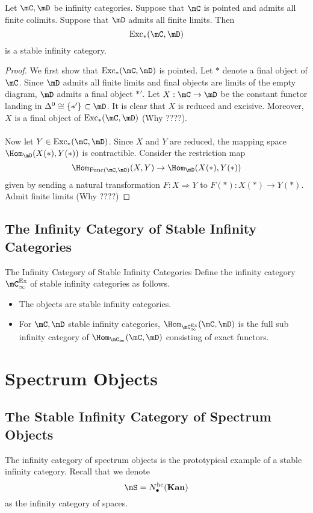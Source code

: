 \documentclass[a4paper]{article}
\begin{document}
\begin{prp}{}{} Let $\mC,\mD$ be infinity categories. Suppose that $\mC$ is pointed and admits all finite colimits. Suppose that $\mD$ admits all finite limits. Then $$\text{Exc}_\ast(\mC,\mD)$$ is a stable infinity category. \tcbline
\begin{proof}
We first show that $\text{Exc}_\ast(\mC,\mD)$ is pointed. Let $\ast$ denote a final object of $\mC$. Since $\mD$ admits all finite limits and final objects are limits of the empty diagram, $\mD$ admits a final object $\ast'$. Let $X:\mC\to\mD$ be the constant functor landing in $\Delta^0\cong\{\ast'\}\subset\mD$. It is clear that $X$ is reduced and excisive. Moreover, $X$ is a final object of $\text{Exc}_\ast(\mC,\mD)$ (Why ????). \\~\\

Now let $Y\in\text{Exc}_\ast(\mC,\mD)$. Since $X$ and $Y$ are reduced, the mapping space $\Hom_\mD(X(\ast),Y(\ast))$ is contractible. Consider the restriction map $$\Hom_{\text{Func}(\mC,\mD)}(X,Y)\to\Hom_\mD(X(\ast),Y(\ast))$$ given by sending a natural transformation $F:X\Rightarrow Y$ to $F(\ast):X(\ast)\to Y(\ast)$. 
Admit finite limits (Why ????)
\end{proof}
\end{prp}

\subsection{The Infinity Category of Stable Infinity Categories}
\begin{defn}{The Infinity Category of Stable Infinity Categories}{} Define the infinity category $\mC_\infty^\text{Ex}$ of stable infinity categories as follows. 
\begin{itemize}
\item The objects are stable infinity categories. 
\item For $\mC,\mD$ stable infinity categories, $\Hom_{\mC_\infty^\text{Ex}}(\mC,\mD)$ is the full sub infinity category of $\Hom_{\mC_\infty}(\mC,\mD)$ consisting of exact functors. 
\end{itemize}
\end{defn}

\pagebreak
\section{Spectrum Objects}
\subsection{The Stable Infinity Category of Spectrum Objects}
The infinity category of spectrum objects is the prototypical example of a stable infinity category. 
Recall that we denote $$\mS=N_\bullet^\text{hc}(\bold{Kan})$$ as the infinity category of spaces. 
\end{document}
